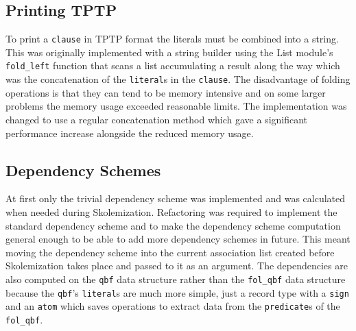 \subsection{Printing TPTP}
To print a \texttt{clause} in TPTP format the literals must be combined into a string. This was originally implemented with a string builder using the List module's \texttt{fold\_left} function that scans a list accumulating a result along the way which was the concatenation of the \texttt{literal}s in the \texttt{clause}. The disadvantage of folding operations is that they can tend to be memory intensive and on some larger problems the memory usage exceeded reasonable limits. The implementation was changed to use a regular concatenation method which gave a significant performance increase alongside the reduced memory usage.

\subsection{Dependency Schemes}
At first only the trivial dependency scheme was implemented and was calculated when needed during Skolemization. Refactoring was required to implement the standard dependency scheme and to make the dependency scheme computation general enough to be able to add more dependency schemes in future. This meant moving the dependency scheme into the current association list created before Skolemization takes place and passed to it as an argument. The dependencies are also computed on the \texttt{qbf} data structure rather than the \texttt{fol\_qbf} data structure because the \texttt{qbf}'s \texttt{literal}s are much more simple, just a record type with a \texttt{sign} and an \texttt{atom} which saves operations to extract data from the \texttt{predicate}s of the \texttt{fol\_qbf}.
